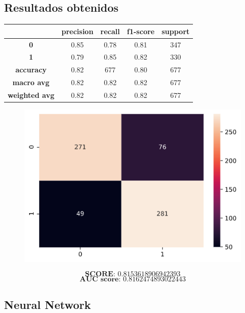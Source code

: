 \documentclass[11pt,a4paper]{article}
\begin{document}
\subsection*{Resultados obtenidos}
\begin{table}[H]
    \centering
    \begin{tabular}{c|cccc}
        \textbf{} & \textbf{precision} & \textbf{recall} & \textbf{f1-score} & \textbf{support} \\ \hline
        \textbf{0} & 0.85 & 0.78 & 0.81 & 347 \\
        \textbf{1} & 0.79 & 0.85 & 0.82 & 330 \\ \hline
        \textbf{accuracy} & 0.82 & 677 & 0.80 & 677 \\
        \textbf{macro avg} & 0.82 & 0.82 & 0.82 & 677 \\
        \textbf{weighted avg} & 0.82 & 0.82 & 0.82 & 677
    \end{tabular}
\end{table}

\begin{figure}[H]
    \centering
    \includegraphics[scale=0.5]{img/matrix-naivebayes.png}    
\end{figure}
$$\textbf{SCORE:  } 0.8153618906942393$$
$$\textbf{AUC score:  } 0.8162474893022443$$


\subsection{Neural Network}
\end{document}
